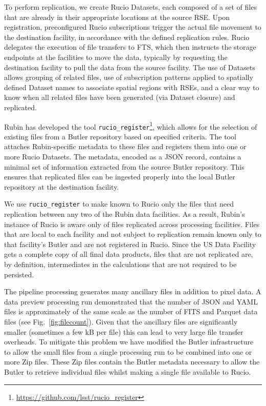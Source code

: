 \documentclass{webofc}
\begin{document}
To perform replication, we create Rucio Datasets, each composed of a set of files that are already in their appropriate locations at the source RSE. Upon registration, preconfigured Rucio subscriptions trigger the actual file movement to the destination facility, in accordance with the defined replication rules. Rucio delegates the execution of file transfers to FTS, which then instructs the storage endpoints at the facilities to move the data, typically by requesting the destination facility to pull the data from the source facility. The use of Datasets allows grouping of related files, use of subscription patterns applied to spatially defined Dataset names to associate spatial regions with RSEs, and a clear way to know when all related files have been generated (via Dataset closure) and replicated.

Rubin has developed the tool \texttt{rucio\_register}\footnote{\url{https://github.com/lsst/rucio_register}}, which allows for the selection of existing files from a Butler repository based on specified criteria. The tool attaches Rubin-specific metadata to these files and registers them into one or more Rucio Datasets. The metadata, encoded as a JSON record, contains a minimal set of information extracted from the source Butler repository. This ensures that replicated files can be ingested properly into the local Butler repository at the destination facility.

We use \texttt{rucio\_register} to make known to Rucio only the files that need replication between any two of the Rubin data facilities. As a result, Rubin's instance of Rucio is aware only of files replicated across processing facilities. Files that are local to each facility and not subject to replication remain known only to that facility's Butler and are not registered in Rucio. Since the US Data Facility gets a complete copy of all final data products, files that are not replicated are, by definition,  intermediates in the calculations that are not required to be persisted.

The pipeline processing generates many ancillary files in addition to pixel data.
A data preview processing run \cite{10.1051/epjconf/20242950404} demonstrated that the number of JSON and YAML files is approximately of the same scale as the number of FITS and Parquet data files (see Fig.\ \ref{fig:filecount}).
Given that the ancillary files are significantly smaller (sometimes a few kB per file) this can lead to very large file transfer overheads.
To mitigate this problem we have modified the Butler infrastructure to allow the small files from a single processing run to be combined into one or more Zip files.
These Zip files contain the Butler metadata necessary to allow the Butler to retrieve individual files whilst making a single file available to Rucio.
\end{document}
